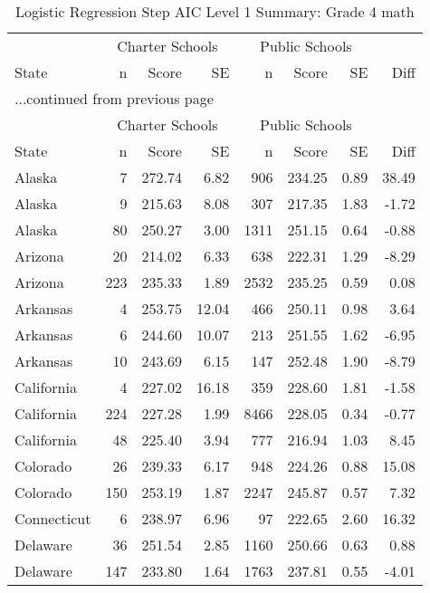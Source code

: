 \begin{longtable}{lrrr@{\extracolsep{10pt}}rrrr}
\caption{Logistic Regression Step AIC Level 1 Summary: Grade 4 math} \\ 
  \hline
  & \multicolumn{3}{c}{Charter Schools} & \multicolumn{3}{c}{Public Schools} & \\ \cline{2-4} \cline{5-7} State & n & Score & SE & n & Score & SE & Diff \\ \endfirsthead \multicolumn{8}{l}{{...continued from previous page}}\\ \hline & \multicolumn{3}{c}{Charter Schools} & \multicolumn{3}{c}{Public Schools} & \\ \cline{2-4} \cline{5-7} State & n & Score & SE & n & Score & SE & Diff \\ \hline \endhead \hline \endfoot \endlastfoot \hline
Alaska &   7 & 272.74 & 6.82 & 906 & 234.25 & 0.89 & 38.49 \\ 
  Alaska &   9 & 215.63 & 8.08 & 307 & 217.35 & 1.83 & -1.72 \\ 
  Alaska &  80 & 250.27 & 3.00 & 1311 & 251.15 & 0.64 & -0.88 \\ 
  Arizona &  20 & 214.02 & 6.33 & 638 & 222.31 & 1.29 & -8.29 \\ 
  Arizona & 223 & 235.33 & 1.89 & 2532 & 235.25 & 0.59 & 0.08 \\ 
  Arkansas &   4 & 253.75 & 12.04 & 466 & 250.11 & 0.98 & 3.64 \\ 
  Arkansas &   6 & 244.60 & 10.07 & 213 & 251.55 & 1.62 & -6.95 \\ 
  Arkansas &  10 & 243.69 & 6.15 & 147 & 252.48 & 1.90 & -8.79 \\ 
  California &   4 & 227.02 & 16.18 & 359 & 228.60 & 1.81 & -1.58 \\ 
  California & 224 & 227.28 & 1.99 & 8466 & 228.05 & 0.34 & -0.77 \\ 
  California &  48 & 225.40 & 3.94 & 777 & 216.94 & 1.03 & 8.45 \\ 
  Colorado &  26 & 239.33 & 6.17 & 948 & 224.26 & 0.88 & 15.08 \\ 
  Colorado & 150 & 253.19 & 1.87 & 2247 & 245.87 & 0.57 & 7.32 \\ 
  Connecticut &   6 & 238.97 & 6.96 &  97 & 222.65 & 2.60 & 16.32 \\ 
  Delaware &  36 & 251.54 & 2.85 & 1160 & 250.66 & 0.63 & 0.88 \\ 
  Delaware & 147 & 233.80 & 1.64 & 1763 & 237.81 & 0.55 & -4.01 \\ 

\end{longtable}
